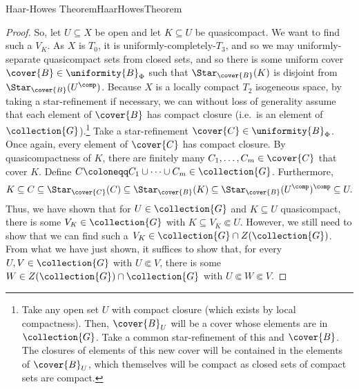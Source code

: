 \begin{thm}{Haar-Howes Theorem}{HaarHowesTheorem}
\begin{proof}
So, let $U\subseteq X$ be open and let $K\subseteq U$ be quasicompact.  We want to find such a $V_K$.  As $X$ is $T_0$, it is uniformly-completely-$T_3$, and so we may uniformly-separate quasicompact sets from closed sets, and so there is some uniform cover $\cover{B}\in \uniformity{B}_\Phi$ such that $\Star _{\cover{B}}(K)$ is disjoint from $\Star _{\cover{B}}(U^{\comp})$.  Because $X$ is a locally compact $T_2$ isogeneous space, by taking a star-refinement if necessary, we can without loss of generality assume that each element of $\cover{B}$ has compact closure (i.e.~is an element of $\collection{G}$).\footnote{Take any open set $U$ with compact closure (which exists by local compactness).  Then, $\cover{B}_U$ will be a cover whose elements are in $\collection{G}$.  Take a common star-refinement of this and $\cover{B}$.  The closures of elements of this new cover will be contained in the elements of $\cover{B}_U$, which themselves will be compact as closed sets of compact sets are compact.}  Take a star-refinement $\cover{C}\in \uniformity{B}_{\Phi}$.  Once again, every element of $\cover{C}$ has compact closure.  By quasicompactness of $K$, there are finitely many $C_1,\ldots ,C_m\in \cover{C}$ that cover $K$.  Define $C\coloneqq C_1\cup \cdots \cup C_m\in \collection{G}$.  Furthermore,
\begin{equation}
K\subseteq C\subseteq \Star _{\cover{C}}(C)\subseteq \Star _{\cover{B}}(K)\subseteq \Star _{\cover{B}}(U^{\comp})^{\comp}\subseteq U.
\end{equation}
Thus, we have shown that for $U\in \collection{G}$ and $K\subseteq U$ quasicompact, there is some $V_K\in \collection{G}$ with $K\subseteq V_K\Subset U$.  However, we still need to show that we can find such a $V_K\in \collection{G}\cap Z(\collection{G})$.  From what we have just shown, it suffices to show that, for every $U,V\in \collection{G}$ with $U\Subset V$, there is some $W\in Z(\collection{G})\cap \collection{G}$ with $U\Subset W\Subset V$.


\end{proof}
\end{thm}
